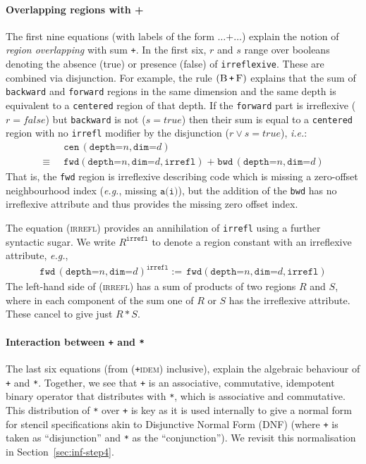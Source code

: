 \documentclass[9pt,preprint]{sigplanconf}
\theoremstyle{definition}
\newcommand{\ie}{\emph{i.e.}}
\newcommand{\eg}{\emph{e.g.}}
\newcommand{\term}[1]{\texttt{#1}}
\newcommand{\irrefl}{\texttt{irreflexive}}
\newcommand{\stenFwdS}[2]{\term{fwd} \, (\term{depth=}#1,
  \term{dim=}#2)}
\newcommand{\stenBwdS}[2]{\term{bwd} \, (\term{depth=}#1,
  \term{dim=}#2)}
\newcommand{\stenCenS}[2]{\term{cen} \, (\term{depth=}#1,
  \term{dim=}#2)}
\newcommand{\irreflS}{\texttt{irrefl}}
\newcommand{\stenFwdSR}[3]{\term{fwd} (\term{depth=}#1,
  \term{dim=}#2, #3)}
\begin{document}
\paragraph{Overlapping regions with +}
The first nine
equations (with labels of the form $\ldots \texttt{+} \ldots$)
explain the notion of \emph{region overlapping} with sum
\term{+}. In the first six, $r$ and $s$ range
over booleans denoting the absence (true) or presence (false)
of \irrefl{}. These are combined via disjunction. For example,
the rule $(\textsc{B} \, \term{+} \,
\textsc{F})$ explains that the sum of \term{backward}
and \term{forward} regions in the same dimension and the same
depth is equivalent to a \term{centered} region of that depth.
If the \term{forward} part is irreflexive ($r =
\textit{false}$) but \term{backward} is not ($s =
\textit{true}$) then their sum is equal to a \term{centered}
region with no \irreflS{} modifier by the disjunction ($r \vee s =
\textit{true}$), \ie{}:
\begin{align*}
& \stenCenS{n}{d}  \\[-0.2em]
\equiv \;\; & \stenFwdSR{n}{d}{\irreflS} \; \texttt{+} \; \stenBwdS{n}{d}
\end{align*}
That is, the \term{fwd} region is irreflexive describing code which is missing
a zero-offset neighbourhood index (\eg{}, missing $\texttt{a(i)}$), but the addition of
the \term{bwd} has no irreflexive attribute and thus provides the
missing zero offset index.

The equation (\textsc{irrefl}) provides an annihilation of
\irreflS{} using a further syntactic sugar.
We write $R^{\irreflS}$ to denote a region constant with an
irreflexive attribute, \eg{},
\begin{align*}
\stenFwdS{n}{d}^{\irreflS}  := \,
\stenFwdSR{n}{d}{\irreflS}
\end{align*}
The left-hand side of (\textsc{irrefl}) has a sum of
products of two regions $R$ and $S$, 
where in each component of the sum one of $R$
or $S$ has the irreflexive attribute. These cancel to give
just $R \, \term{*} \, S$.


\paragraph{Interaction between \term{+} and \term{*}}

The last six equations (from (\textsc{\term{+}idem}) inclusive), explain
the algebraic behaviour of \term{+} and \term{*}.  Together, we see
that \term{+} is an associative, commutative, idempotent binary
operator that distributes with \term{*}, which is associative and
commutative. This distribution of \term{*} over \term{+} is key as it
is used internally to give a normal form for stencil specifications
akin to Disjunctive Normal Form (DNF) (where \term{+} is taken as
``disjunction'' and \term{*} as the ``conjunction''). We revisit this
normalisation in Section~\ref{sec:inf-step4}.
\end{document}
